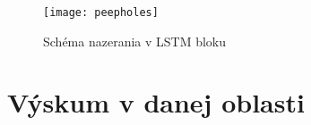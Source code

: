 \begin{figure}[H]
\begin{center}
\texttt{[image: peepholes]}\end{center}
\caption[peepholes]{Schéma nazerania v LSTM bloku}\label{fig:peepholes}
\end{figure}

\section{Výskum v danej oblasti}
\label{analyza_vyskum_danej_oblasti}

\begin{comment}
\section{Časť}
\label{sec:Časť}
V tejto časti sa venujeme 
\begin{figure}[H]
\begin{center}\texttt{[image: figure]}\end{center}
\caption[Name figure]{Name figure}\label{fig:figure}
\end{figure}

\subsection{Číslovaný zoznam}
\begin{my_enumerate}
	\item {cieľ 1}
	\begin{my_enumerate}
		\item {cieľ 1.a}
		\item {cieľ 1.b}
	\end{my_enumerate}
	\item {cieľ 2}
	\item {cieľ 3}
\end{my_enumerate}

\subsection{Citácia}
Lorem ipsum dolor sit amet, consectetuer adipiscing elit, sed diam nonummy nibh euismod tincidunt ut laoreet dolore magna aliquam erat volutpat~\cite{1}.


\end{comment}
